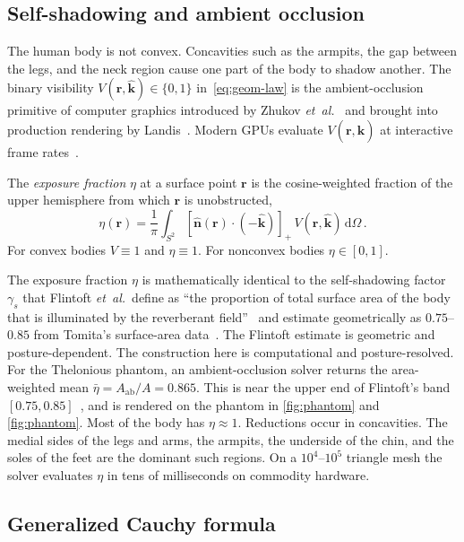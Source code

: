 \documentclass[journal,twocolumn,10pt]{IEEEtran}
\theoremstyle{plain}
\newcommand{\khat}{\hat{\bm{k}}}
\newcommand{\nhat}{\hat{\bm{n}}}
\newcommand{\rr}{\mathbf{r}}
\newcommand{\Aab}{A_{\mathrm{ab}}}
\newcommand{\diff}{\mathrm{d}}
\newcommand{\pospart}[1]{\left[#1\right]_{+}}
\newcommand{\Vis}{V}
\begin{document}
\subsection{Self-shadowing and ambient occlusion}\label{sec:self-shadow}

The human body is not convex. Concavities such as the armpits, the
gap between the legs, and the neck region cause one part of the body
to shadow another. The binary visibility $\Vis(\rr,\khat) \in \{0,1\}$
in~\eqref{eq:geom-law} is the ambient-occlusion primitive of computer
graphics introduced by Zhukov \textit{et~al.}~\cite{Zhukov1998} and brought
into production rendering by Landis~\cite{Landis2002}. Modern GPUs
evaluate $\Vis(\rr,\khat)$ at interactive frame
rates~\cite{AkenineMoller2018}.

The \textit{exposure fraction} $\eta$ at a surface point $\rr$ is the cosine-weighted
fraction of the upper hemisphere from which $\rr$ is unobstructed,
\begin{equation}\label{eq:eta-def}
  \eta(\rr) = \frac{1}{\pi}\int_{S^2}
  \pospart{\nhat(\rr)\cdot(-\khat)}\,\Vis(\rr,\khat)\,\diff\Omega\, .
\end{equation}
For convex bodies $\Vis \equiv 1$ and $\eta \equiv 1$. For nonconvex
bodies $\eta \in [0,1]$.

The exposure fraction $\eta$ is mathematically identical to the
self-shadowing factor $\gamma_s$ that Flintoft \textit{et~al.}\ define as
``the proportion of total surface area of the body that is illuminated
by the reverberant field''~\cite[p.~3301]{Flintoft2014} and estimate
geometrically as $0.75$--$0.85$ from Tomita's surface-area
data~\cite{Tomita1999}. The Flintoft estimate is geometric and
posture-dependent. The construction here is computational and
posture-resolved. For the Thelonious phantom, an ambient-occlusion
solver returns the area-weighted mean
$\bar{\eta} = \Aab/A = 0.865$. This is near the upper end of
Flintoft's band $[0.75, 0.85]$~\cite{Tomita1999}, and is rendered
on the phantom in \cref{fig:phantom}
and \cref{fig:phantom}. Most of the
body has $\eta \approx 1$. Reductions occur in concavities. The
medial sides of the legs and arms, the armpits, the underside of
the chin, and the soles of the feet are the dominant such regions.
On a $10^4$--$10^5$ triangle mesh the solver evaluates $\eta$ in
tens of milliseconds on commodity hardware.

\subsection{Generalized Cauchy formula}\label{subsec:cauchy-thm}
\end{document}
